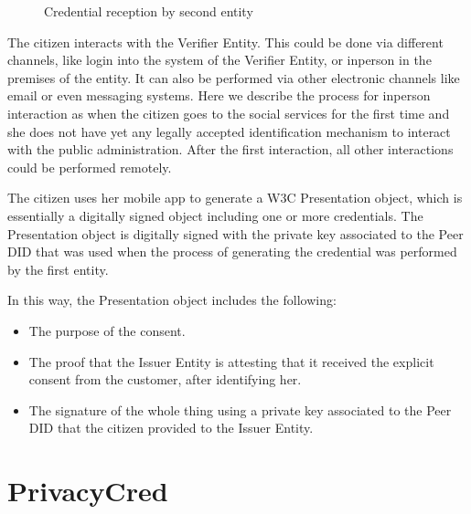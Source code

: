 \documentclass[a4paper,12pt,english,openany]{sphinxmanual}
\begin{document}
\begin{figure}[htbp]
\centering
\capstart

\noindent{}
\caption{Credential reception by second entity}\label{\detokenize{privacyconsent:id2}}\end{figure}

\sphinxAtStartPar
The citizen interacts with the Verifier Entity. This could be done via different channels, like login into the system of the Verifier Entity, or in\sphinxhyphen{}person in the premises of the entity. It can also be performed via other electronic channels like email or even messaging systems. Here we describe the process for in\sphinxhyphen{}person interaction as when the citizen goes to the social services for the first time and she does not have yet any legally accepted identification mechanism to interact with the public administration. After the first interaction, all other interactions could be performed remotely.

\sphinxAtStartPar
The citizen uses her mobile app to generate a W3C Presentation object, which is essentially a digitally signed object including one or more credentials. The Presentation object is digitally signed with the private key associated to the Peer DID that was used when the process of generating the credential was performed by the first entity.

\sphinxAtStartPar
In this way, the Presentation object includes the following:
\begin{itemize}
\item {} 
\sphinxAtStartPar
The purpose of the consent.

\item {} 
\sphinxAtStartPar
The proof that the Issuer Entity is attesting that it received the explicit consent from the customer, after identifying her.

\item {} 
\sphinxAtStartPar
The signature of the whole thing using a private key associated to the Peer DID that the citizen provided to the Issuer Entity.

\end{itemize}


\chapter{PrivacyCred}
\label{\detokenize{privacycred:privacycred}}\label{\detokenize{privacycred::doc}}
\end{document}
